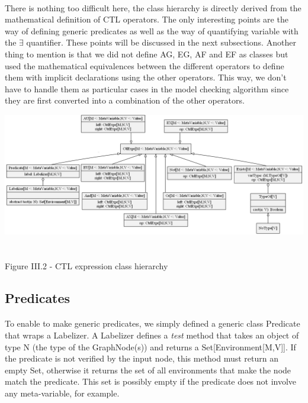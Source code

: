\documentclass{report}
\begin{document}
\paragraph{}
\hspace{4mm}There is nothing too difficult here, the class hierarchy is directly derived from the mathematical
definition of CTL operators. The only interesting points are the way of defining generic predicates as well as the way of quantifying variable with the $\exists$ quantifier. These points
will be discussed in the next subsections. Another thing to mention is that we did not define AG, EG, AF and EF as classes but used the mathematical equivalences between the different operators
to define them with implicit declarations using the other operators. This way, we don't have to handle them as particular cases in the model checking algorithm since they are first converted into
a combination of the other operators.

\begin{center}
\includegraphics[scale=0.4]{data/CTL_expr.png}
~\\~\\Figure III.2 - CTL expression class hierarchy
\end{center}

\subsection{Predicates}

\paragraph{}
\hspace{4mm}To enable to make generic predicates, we simply defined a generic class Predicate that wraps a Labelizer. A Labelizer
defines a \textit{test} method that takes an object of type N (the type of the GraphNode(s)) and returns a Set[Environment[M,V]].
If the predicate is not verified by the input node, this method must return an empty Set, otherwise it returns the set of all environments that make the node
match the predicate. This set is possibly empty if the predicate does not involve any meta-variable, for example.
\end{document}
